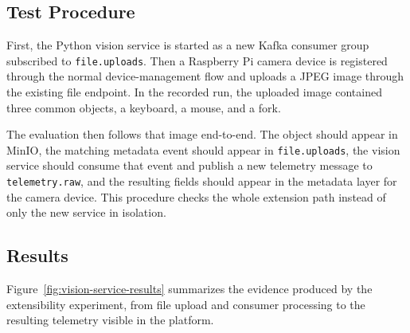 \subsection{Test Procedure}
\label{subsec:EvalExtensibilityProcedure}

First, the Python vision service is started as a new Kafka consumer group subscribed to \texttt{file.uploads}. Then a Raspberry Pi camera device is registered through the normal device-management flow and uploads a JPEG image through the existing file endpoint. In the recorded run, the uploaded image contained three common objects, a keyboard, a mouse, and a fork.

The evaluation then follows that image end-to-end. The object should appear in MinIO, the matching metadata event should appear in \texttt{file.uploads}, the vision service should consume that event and publish a new telemetry message to \texttt{telemetry.raw}, and the resulting fields should appear in the metadata layer for the camera device. This procedure checks the whole extension path instead of only the new service in isolation.

\subsection{Results}
\label{subsec:EvalExtensibilityResults}

Figure~\ref{fig:vision-service-results} summarizes the evidence produced by the extensibility experiment, from file upload and consumer processing to the resulting telemetry visible in the platform.

